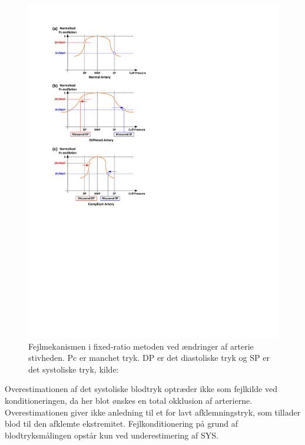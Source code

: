 \begin{minipage}[t]{0.5\textwidth}
	\begin{figure}[H]
		\centering
		\includegraphics[width=1\textwidth]{billeder/ErrorFixed-Ratio.pdf}
		\caption{Fejlmekanismen i fixed-ratio metoden ved ændringer af arterie stivheden. Pc er manchet tryk. DP er det diastoliske tryk og SP er det systoliske tryk, kilde: \cite{RefWorks:13}}\label{fig:ErrorMechanismOfFixedRatio}
	\end{figure}
\end{minipage}


Overestimationen af det systoliske blodtryk optræder ikke som fejlkilde ved konditioneringen, da her blot ønskes en total okklusion af arterierne. Overestimationen giver ikke anledning til et for lavt afklemningstryk, som tillader blod til den afklemte ekstremitet. Fejlkonditionering på grund af blodtryksmålingen opstår kun ved underestimering af SYS.


